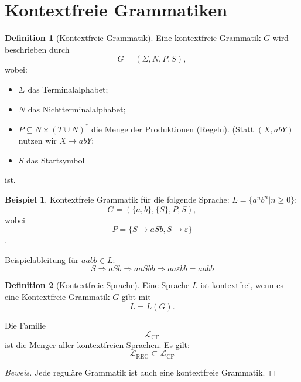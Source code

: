 \documentclass[11pt]{article} %
\theoremstyle{definition}
\newtheorem*{beispiel}{Beispiel}
\newtheorem{definition}{Definition}
\begin{document}
\section{Kontextfreie Grammatiken}

\begin{definition}[Kontextfreie Grammatik]
Eine kontextfreie Grammatik $G$ wird beschrieben durch
\[
G = (\Sigma, N, P, S),
\]
wobei:
\begin{itemize}
\item $\Sigma$ das Terminalalphabet;
\item $N$ das Nichtterminalalphabet;
\item $P \subseteq N \times (T \cup N)^*$ die Menge der Produktionen (Regeln). (Statt $(X, abY)$ nutzen wir $X \rightarrow abY$;
\item $S$ das Startsymbol
\end{itemize}
ist.

\end{definition}

\begin{beispiel}
Kontextfreie Grammatik für die folgende Sprache: $L = \{a^nb^n | n \ge 0 \}$:
\[
G = (\{a,b\}, \{S\}, P, S),
\]
wobei 
\[
P = \{ S \rightarrow aSb, S \rightarrow \varepsilon \}
\].

Beispielableitung für $aabb \in L$:
\[
S \Rightarrow aSb \Rightarrow aaSbb \Rightarrow aa\varepsilon bb = aabb
\]
\end{beispiel}

\begin{definition}[Kontextfreie Sprache]
Eine Sprache $L$ ist kontextfrei, wenn es eine Kontextfreie Grammatik $G$ gibt mit \[
L = L(G).
\]
\end{definition}

Die Familie
\[
\mathcal{L}_{\textrm{CF}}
\]
ist die Menger aller kontextfreien Sprachen. Es gilt:
\[
\mathcal{L}_{\textrm{REG}} \subseteq \mathcal{L}_{\textrm{CF}}
\]

\begin{proof}[Beweis]
Jede reguläre Grammatik ist auch eine kontextfreie Grammatik.
\end{proof}
\end{document}
